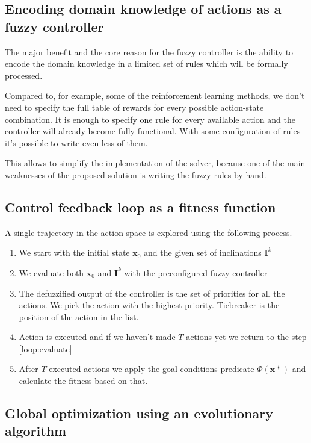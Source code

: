 \documentclass[11pt, a4paper]{article}
\begin{document}
	\subsection{Encoding domain knowledge of actions as a fuzzy controller}

	The major benefit and the core reason for the fuzzy controller is the ability to encode the domain knowledge in a limited set of rules which will be formally processed.
	
	Compared to, for example, some of the reinforcement learning methods, we don't need to specify the full table of rewards for every possible action-state combination.
	It is enough to specify one rule for every available action and the controller will already become fully functional.
	With some configuration of rules it's possible to write even less of them.
	
	This allows to simplify the implementation of the solver, because one of the main weaknesses of the proposed solution is writing the fuzzy rules by hand.
	
	\subsection{Control feedback loop as a fitness function}\label{fitness}

	A single trajectory in the action space is explored using the following process.
	
	\begin{enumerate}
		\item We start with the initial state $\mathbf{x}_0$ and the given set of inclinations $\mathbf{I}^k$
		\item\label{loop:evaluate} We evaluate both $\mathbf{x}_0$ and $\mathbf{I}^k$ with the preconfigured fuzzy controller
		\item The defuzzified output of the controller is the set of priorities for all the  actions. We pick the action with the highest priority. Tiebreaker is the position of the action in the list.
		\item Action is executed and if we haven't made $T$ actions yet we return to the step \ref{loop:evaluate}
		\item After $T$ executed actions we apply the goal conditions predicate $\Phi(\mathbf{x}*)$ and calculate the fitness based on that.
	\end{enumerate}

	\subsection{Global optimization using an evolutionary algorithm}
\end{document}
